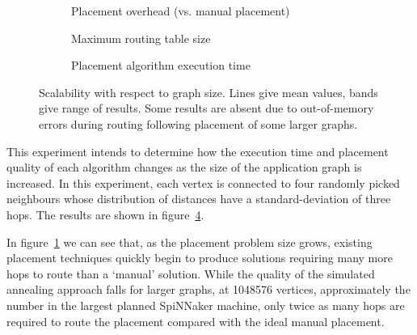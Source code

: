 				\begin{figure}
					\center
					\begin{subfigure}{\linewidth}
						\center
						
						\caption{Placement overhead (vs. manual placement)}
						\label{fig:placement-scalability-size-quality}
					\end{subfigure}
					
					\vspace*{1em}
					
					\begin{subfigure}{\linewidth}
						\center
						
						\caption{Maximum routing table size}
						\label{fig:placement-scalability-size-entries}
					\end{subfigure}
					
					\vspace*{1em}
					
					\begin{subfigure}{\linewidth}
						\center
						
						\caption{Placement algorithm execution time}
						\label{fig:placement-scalability-size-runtime}
					\end{subfigure}
					
					\caption[Placer scalability with respect to graph size.]%
					{Scalability with respect to graph size. Lines give mean
					values, bands give range of results. Some results are absent due to
					out-of-memory errors during routing following placement of some
					larger graphs.}
					\label{fig:placement-scalability-size}
				\end{figure}
				
				This experiment intends to determine how the execution time and
				placement quality of each algorithm changes as the size of the
				application graph is increased. In this experiment, each vertex is
				connected to four randomly picked neighbours whose distribution of
				distances have a standard-deviation of three hops. The results are
				shown in figure~\ref{fig:placement-scalability-size}.
				
				In figure~\ref{fig:placement-scalability-size-quality} we can see that,
				as the placement problem size grows, existing placement techniques
				quickly begin to produce solutions requiring many more hops to route
				than a `manual' solution. While the quality of the simulated annealing
				approach falls for larger graphs, at \num{1048576} vertices,
				approximately the number in the largest planned SpiNNaker machine, only
				twice as many hops are required to route the placement compared with
				the ideal manual placement.
				
